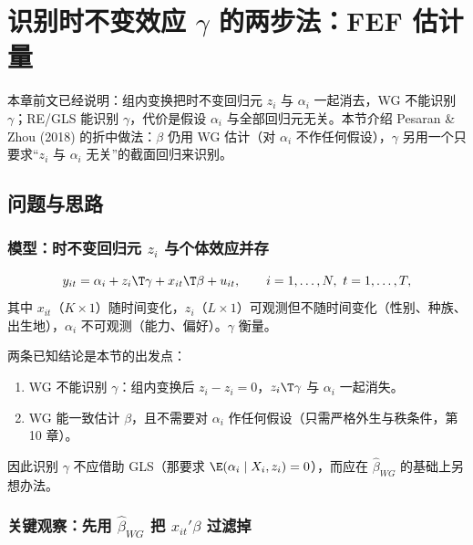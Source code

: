 
\section{识别时不变效应 \texorpdfstring{$\gamma$}{gamma} 的两步法：FEF 估计量}\label{sec:U11b-fef}

本章前文已经说明：组内变换把时不变回归元 $z_i$ 与 $\alpha_i$ 一起消去，WG 不能识别 $\gamma$；RE/GLS 能识别 $\gamma$，代价是假设 $\alpha_i$ 与全部回归元无关。本节介绍 Pesaran \& Zhou (2018) 的折中做法：$\beta$ 仍用 WG 估计（对 $\alpha_i$ 不作任何假设），$\gamma$ 另用一个只要求“$z_i$ 与 $\alpha_i$ 无关”的截面回归来识别。

\subsection{问题与思路}

\subsubsection{模型：时不变回归元 \texorpdfstring{$z_i$}{z\_i} 与个体效应并存}

\begin{equation}\label{eq:U11b-model}
y_{it}=\alpha_i+z_i\T\gamma+x_{it}\T\beta+u_{it},\qquad i=1,\dots,N,\ t=1,\dots,T,
\end{equation}
其中 $x_{it}$（$K\times1$）随时间变化，$z_i$（$L\times1$）可观测但不随时间变化（性别、种族、出生地），$\alpha_i$ 不可观测（能力、偏好）。$\gamma$ 衡量。

两条已知结论是本节的出发点：
\begin{enumerate}
  \item WG 不能识别 $\gamma$：组内变换后 $z_i-z_i=0$，$z_i\T\gamma$ 与 $\alpha_i$ 一起消失。
  \item WG 能一致估计 $\beta$，且不需要对 $\alpha_i$ 作任何假设（只需严格外生与秩条件，第 10 章）。
\end{enumerate}
因此识别 $\gamma$ 不应借助 GLS（那要求 $\E(\alpha_i\mid X_i,z_i)=0$），而应在 $\hat\beta_{WG}$ 的基础上另想办法。

\subsubsection{关键观察：先用 \texorpdfstring{$\hat\beta_{WG}$}{beta\_WG} 把 \texorpdfstring{$x_{it}'\beta$}{x'beta} 过滤掉}

